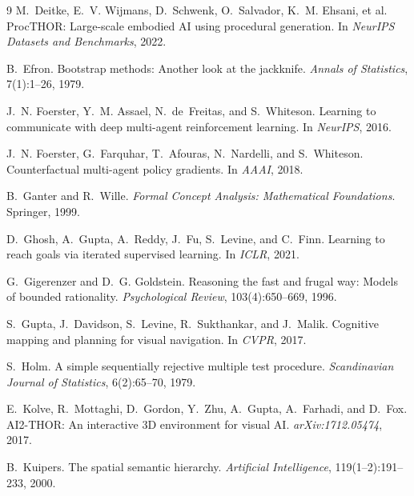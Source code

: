 \documentclass{article}
\begin{document}
{\begin{thebibliography}{9}
M.~Deitke, E.~V. Wijmans, D.~Schwenk, O.~Salvador, K.~M. Ehsani, et al.
\newblock ProcTHOR: Large-scale embodied AI using procedural generation.
\newblock In \emph{NeurIPS Datasets and Benchmarks}, 2022.

B.~Efron.
\newblock Bootstrap methods: Another look at the jackknife.
\newblock \emph{Annals of Statistics}, 7(1):1--26, 1979.

J.~N. Foerster, Y.~M. Assael, N.~de~Freitas, and S.~Whiteson.
\newblock Learning to communicate with deep multi-agent reinforcement learning.
\newblock In \emph{NeurIPS}, 2016.

J.~N. Foerster, G.~Farquhar, T.~Afouras, N.~Nardelli, and S.~Whiteson.
\newblock Counterfactual multi-agent policy gradients.
\newblock In \emph{AAAI}, 2018.

B.~Ganter and R.~Wille.
\newblock \emph{Formal Concept Analysis: Mathematical Foundations}.
\newblock Springer, 1999.

D.~Ghosh, A.~Gupta, A.~Reddy, J.~Fu, S.~Levine, and C.~Finn.
\newblock Learning to reach goals via iterated supervised learning.
\newblock In \emph{ICLR}, 2021.

G.~Gigerenzer and D.~G. Goldstein.
\newblock Reasoning the fast and frugal way: Models of bounded rationality.
\newblock \emph{Psychological Review}, 103(4):650--669, 1996.

S.~Gupta, J.~Davidson, S.~Levine, R.~Sukthankar, and J.~Malik.
\newblock Cognitive mapping and planning for visual navigation.
\newblock In \emph{CVPR}, 2017.

S.~Holm.
\newblock A simple sequentially rejective multiple test procedure.
\newblock \emph{Scandinavian Journal of Statistics}, 6(2):65--70, 1979.

E.~Kolve, R.~Mottaghi, D.~Gordon, Y.~Zhu, A.~Gupta, A.~Farhadi, and D.~Fox.
\newblock AI2-THOR: An interactive 3D environment for visual AI.
\newblock \emph{arXiv:1712.05474}, 2017.

B.~Kuipers.
\newblock The spatial semantic hierarchy.
\newblock \emph{Artificial Intelligence}, 119(1--2):191--233, 2000.


\end{thebibliography}}
\end{document}
